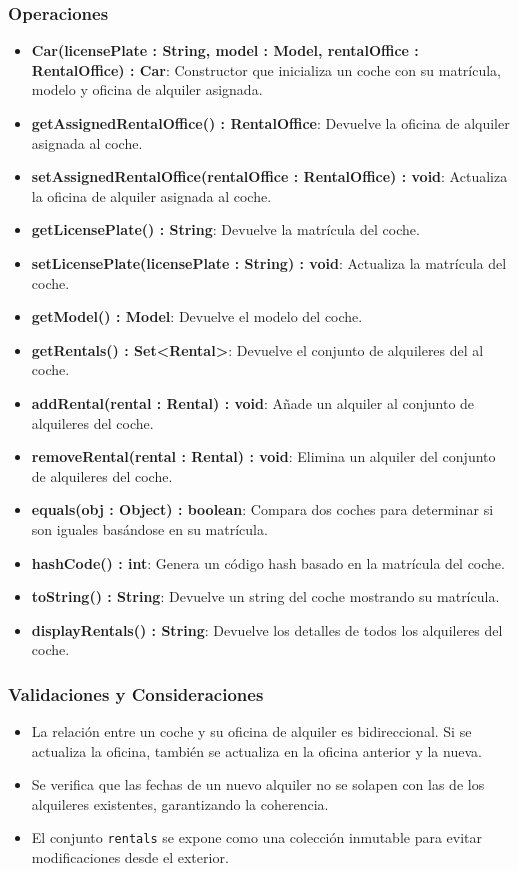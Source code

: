 \subsubsection*{Operaciones}

\begin{itemize}
    \item \textbf{Car(licensePlate : String, model : Model, rentalOffice : RentalOffice) : Car}: 
    Constructor que inicializa un coche con su matrícula, modelo y oficina de alquiler asignada.
    \item \textbf{getAssignedRentalOffice() : RentalOffice}: Devuelve la oficina de alquiler asignada al coche.
    \item \textbf{setAssignedRentalOffice(rentalOffice : RentalOffice) : void}: Actualiza la oficina de alquiler asignada al coche.
    \item \textbf{getLicensePlate() : String}: Devuelve la matrícula del coche.
    \item \textbf{setLicensePlate(licensePlate : String) : void}: Actualiza la matrícula del coche.
    \item \textbf{getModel() : Model}: Devuelve el modelo del coche.
    \item \textbf{getRentals() : Set<Rental>}: Devuelve el conjunto de alquileres del al coche.
    \item \textbf{addRental(rental : Rental) : void}: Añade un alquiler al conjunto de alquileres del coche. 
    \item \textbf{removeRental(rental : Rental) : void}: Elimina un alquiler del conjunto de alquileres del coche.
    \item \textbf{equals(obj : Object) : boolean}: Compara dos coches para determinar si son iguales basándose en su matrícula.
    \item \textbf{hashCode() : int}: Genera un código hash basado en la matrícula del coche.
    \item \textbf{toString() : String}: Devuelve un string  del coche mostrando su matrícula.
    \item \textbf{displayRentals() : String}: Devuelve los detalles de todos los alquileres del coche.
\end{itemize}

\subsubsection*{Validaciones y Consideraciones}

\begin{itemize}
    \item La relación entre un coche y su oficina de alquiler es bidireccional. Si se actualiza la oficina, también se actualiza en la oficina anterior y la nueva.
    \item Se verifica que las fechas de un nuevo alquiler no se solapen con las de los alquileres existentes, garantizando la coherencia.
    \item El conjunto \texttt{rentals} se expone como una colección inmutable para evitar modificaciones desde el exterior.
\end{itemize}


